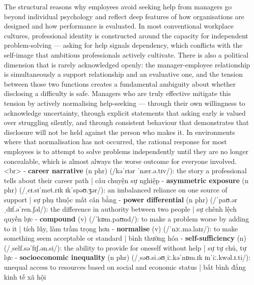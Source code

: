 The structural reasons why employees avoid seeking help from managers go beyond individual psychology and reflect deep features of how organisations are designed and how performance is evaluated. In most conventional workplace cultures, professional identity is constructed around the capacity for independent problem-solving — asking for help signals dependency, which conflicts with the self-image that ambitious professionals actively cultivate. There is also a political dimension that is rarely acknowledged openly: the manager-employee relationship is simultaneously a support relationship and an evaluative one, and the tension between those two functions creates a fundamental ambiguity about whether disclosing a difficulty is safe. Managers who are truly effective mitigate this tension by actively normalising help-seeking — through their own willingness to acknowledge uncertainty, through explicit statements that asking early is valued over struggling silently, and through consistent behaviour that demonstrates that disclosure will not be held against the person who makes it. In environments where that normalisation has not occurred, the rational response for most employees is to attempt to solve problems independently until they are no longer concealable, which is almost always the worse outcome for everyone involved.
<br>
- \textbf{career narrative} (n phr) (/kəˈrɪər ˈnær.ə.tɪv/): the story a professional tells about their career path | câu chuyện sự nghiệp
- \textbf{asymmetric exposure} (n phr) (/ˌeɪ.sɪˈmet.rɪk ɪkˈspəʊ.ʒər/): an imbalanced reliance on one source of support | sự phụ thuộc mất cân bằng
- \textbf{power differential} (n phr) (/ˈpaʊ.ər ˌdɪf.əˈren.ʃəl/): the difference in authority between two people | sự chênh lệch quyền lực
- \textbf{compound} (v) (/ˈkɒm.paʊnd/): to make a problem worse by adding to it | tích lũy, làm trầm trọng hơn
- \textbf{normalise} (v) (/ˈnɔː.mə.laɪz/): to make something seem acceptable or standard | bình thường hóa
- \textbf{self-sufficiency} (n) (/ˌself.səˈfɪʃ.ən.si/): the ability to provide for oneself without help | sự tự chủ, tự lực
- \textbf{socioeconomic inequality} (n phr) (/ˌsəʊ.si.əʊˌiː.kəˈnɒm.ɪk ɪnˈiː.kwəl.ɪ.ti/): unequal access to resources based on social and economic status | bất bình đẳng kinh tế xã hội

\separator


